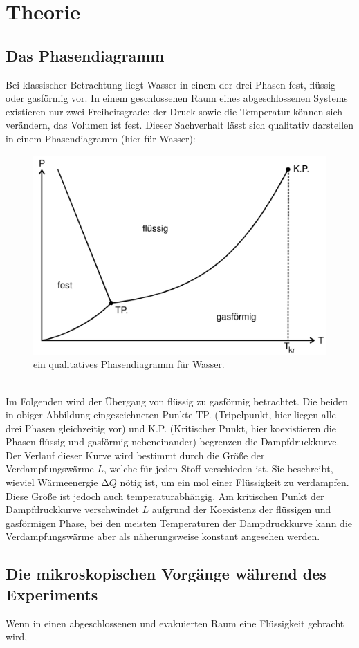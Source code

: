 \section{Theorie}
  \subsection{Das Phasendiagramm}
  Bei klassischer Betrachtung liegt Wasser in einem der drei Phasen fest, flüssig oder gasförmig vor. In einem geschlossenen Raum eines abgeschlossenen Systems existieren nur
  zwei Freiheitsgrade: der Druck sowie die Temperatur können sich verändern, das Volumen ist fest. Dieser Sachverhalt lässt sich qualitativ darstellen in einem Phasendiagramm
  (hier für Wasser):
  \\
  \begin{figure}
    \centering
      \includegraphics[scale = 0.2]{Content/phasendiagramm.png}
      \caption{ein qualitatives Phasendiagramm für Wasser.}
  \end{figure}
  \\
  \noalign
  Im Folgenden wird der Übergang von flüssig zu gasförmig betrachtet. Die beiden in obiger Abbildung eingezeichneten Punkte TP. (Tripelpunkt, hier liegen alle drei Phasen gleichzeitig vor) und K.P. (Kritischer Punkt, hier koexistieren die Phasen flüssig
  und gasförmig nebeneinander)
  begrenzen die Dampfdruckkurve. Der Verlauf dieser Kurve wird bestimmt durch die Größe der Verdampfungswärme $L$, welche für jeden Stoff verschieden ist. Sie beschreibt,
  wieviel Wärmeenergie $\increment Q$ nötig ist, um ein mol einer Flüssigkeit zu verdampfen. Diese Größe ist jedoch auch temperaturabhängig. Am kritischen Punkt der
  Dampfdruckkurve verschwindet $L$ aufgrund der Koexistenz der flüssigen und gasförmigen Phase, bei den meisten Temperaturen der Dampdruckkurve kann die Verdampfungswärme
  aber als näherungsweise konstant angesehen werden.
  \subsection{Die mikroskopischen Vorgänge während des Experiments}
  Wenn in einen abgeschlossenen und evakuierten Raum eine Flüssigkeit gebracht wird, 
\label{sec:Theorie}
